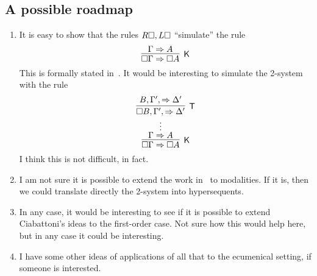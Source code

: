 \documentclass{llncs}
\begin{document}
\subsection{A possible roadmap}
\begin{enumerate}
\item It is easy to show that the rules $R\square,L\square$ ``simulate'' the rule 
\[
\infer[\K]{\Box\Gamma\seq\Box A}{\Gamma\seq A}
\]
This is formally stated in~\cite{DBLP:conf/tableaux/PimentelRL19}. It would be interesting to simulate the 2-system
with the rule
\[
\infer[\K]{\Box\Gamma\seq\Box A}
{\deduce{\Gamma\seq A}
{\deduce{\vdots}
{\infer[\T]{\Box B,\Gamma',\seq\Delta'}{B,\Gamma',\seq\Delta'}}}}
\]
I think this is not difficult, in fact.
\item I am not sure it is possible to extend the work in~\cite{DBLP:journals/tocl/CiabattoniG18} to modalities. If it is, then we could translate directly the 2-system into hypersequents.
\item  In any case, it would be interesting to see if it is possible to extend Ciabattoni's ideas to the first-order case. Not sure how this would help here, but in any case it could be interesting.
\item  I have some other ideas of applications of all that to the ecumenical setting, if someone is interested.
\end{enumerate}


\end{document}
